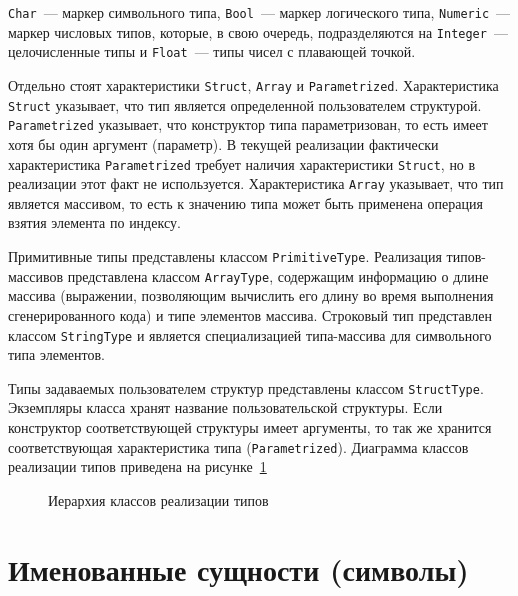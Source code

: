 \documentclass[times,specification,annotation]{style/itmo-student-thesis/itmo-student-thesis}
\begin{document}
\texttt{Char}~--- маркер символьного типа, \texttt{Bool}~--- маркер логического типа, \texttt{Numeric}~--- маркер числовых типов, которые, в свою очередь, подразделяются на \texttt{Integer}~--- целочисленные типы и \texttt{Float}~--- типы чисел с плавающей точкой. 

Отдельно стоят характеристики \texttt{Struct}, \texttt{Array} и \texttt{Parametrized}. Характеристика \texttt{Struct} указывает, что тип является определенной пользователем структурой. \texttt{Parametrized} указывает, что конструктор типа параметризован, то есть имеет хотя бы один аргумент (параметр). В текущей реализации фактически характеристика \texttt{Parametrized} требует наличия характеристики \texttt{Struct}, но в реализации этот факт не используется. Характеристика \texttt{Array} указывает, что тип является массивом, то есть к значению типа может быть применена операция взятия элемента по индексу.

Примитивные типы представлены классом \texttt{PrimitiveType}. Реализация типов-массивов представлена классом \texttt{ArrayType}, содержащим информацию о длине массива (выражении, позволяющим вычислить его длину во время выполнения сгенерированного кода) и типе элементов массива. Строковый тип представлен классом \texttt{StringType} и является специализацией типа-массива для символьного типа элементов.

Типы задаваемых пользователем структур представлены классом \texttt{StructType}. Экземпляры класса хранят название пользовательской структуры. Если конструктор соответствующей структуры имеет аргументы, то так же хранится соответствующая характеристика типа (\texttt{Parametrized}). Диаграмма классов реализации типов приведена на рисунке~\ref{type-classes-hierarchy}

\begin{figure}[!h]
\caption{Иерархия классов реализации типов}\label{type-classes-hierarchy}
\centering
{}
\end{figure}

\section{Именованные сущности (символы)}
\end{document}
